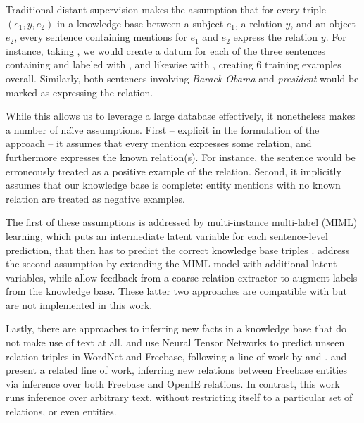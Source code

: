 Traditional distant supervision makes the assumption that
  for every triple $(e_1, y, e_2)$ in a knowledge base between
  a subject $e_1$, a relation $y$, and an object $e_2$, every sentence
  containing mentions for $e_1$ and $e_2$ express the relation $y$.
For instance, taking , we would create a datum for each
  of the three sentences containing  and 
  labeled with , and likewise with
  , creating 6 training examples overall.
Similarly, both sentences involving \textit{Barack Obama} and
  \textit{president} would be marked as expressing the 
  relation.

While this allows us to leverage a large database effectively, it
  nonetheless makes a number of na\"{\i}ve assumptions.
First -- explicit in the formulation of the approach -- it assumes that every
  mention expresses some relation,
  and furthermore expresses the known relation(s).
For instance, the sentence  would be erroneously
  treated as a positive example of the  relation.
Second, it implicitly assumes that our knowledge base is complete:
  entity mentions with no known relation are treated as negative examples.

The first of these assumptions is addressed by
  multi-instance multi-label (MIML) learning, which puts an intermediate latent variable
  for each sentence-level prediction, that then has to predict the correct knowledge base
  triples \cite{key:2012surdeanu-mimlre}.
 address the second assumption by extending the
  MIML model with additional latent variables, while 
  allow feedback from a coarse relation extractor to augment labels from the knowledge base.
These latter two approaches are compatible with but are 
  not implemented in this work.



Lastly, there are approaches to inferring new facts in a knowledge base that do not
  make use of text at all.
 and 
  use Neural Tensor Networks to predict unseen relation triples in
  WordNet and Freebase, following a line of work by
   and
  .
 and 
  present a related line of work, inferring new relations between
  Freebase entities via inference over both Freebase and
  OpenIE relations.
In contrast, this work runs inference over arbitrary text, without 
  restricting itself to a particular set of relations, or even entities.




